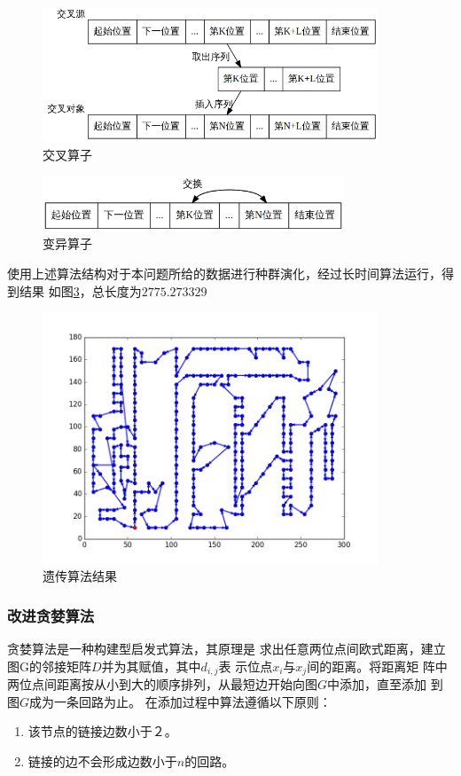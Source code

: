 \documentclass[fontset=windows,a4paper,12pt]{ctexart}
\begin{document}
		\begin{figure}[htbp]
			\centering
			\includegraphics[width=10cm]{pic/life_cross.png}
			\caption{交叉算子}
			\label{fig:cross}
		\end{figure}
		\begin{figure}[htbp]
			\centering
			\includegraphics[width=9cm]{pic/life_muate.png}
			\caption{变异算子}
			\label{fig:muate}
		\end{figure}
        使用上述算法结构对于本问题所给的数据进行种群演化，经过长时间算法运行，得到结果
        如图\ref{fig:ga}，总长度为$2775.273329$
        \begin{figure}[!htbp]
        	\centering
        	\includegraphics[width=10cm]{pic/ga_result.png}
        	\caption{遗传算法结果}
        	\label{fig:ga}
        \end{figure}
      \subsubsection{改进贪婪算法\cite{饶卫振2012基于求解}}
        贪婪算法是一种构建型启发式算法，其原理是
        求出任意两位点间欧式距离，建立图G的邻接矩阵$D$并为其赋值，其中$d_{i,j}$表
        示位点$x_i$与$x_j$间的距离。将距离矩
        阵中两位点间距离按从小到大的顺序排列，从最短边开始向图$G$中添加，直至添加
        到图$G$成为一条回路为止。
        在添加过程中算法遵循以下原则：
        \begin{enumerate}
        	\item 该节点的链接边数小于２。
        	\item 链接的边不会形成边数小于$n$的回路。
        \end{enumerate}
        
\end{document}
